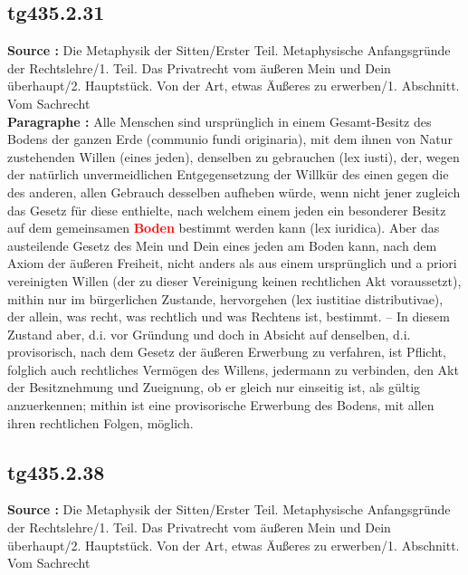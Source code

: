 \documentclass[a4paper,12pt,twoside]{book}
\newcommand{\match}[1]{\textcolor{red}{\textbf{#1}}}
\begin{document}
	\subsection*{tg435.2.31} 
	\textbf{Source : }Die Metaphysik der Sitten/Erster Teil. Metaphysische Anfangsgründe der Rechtslehre/1. Teil. Das Privatrecht vom äußeren Mein und Dein überhaupt/2. Hauptstück. Von der Art, etwas Äußeres zu erwerben/1. Abschnitt. Vom Sachrecht\\  
	
	\textbf{Paragraphe : }Alle Menschen sind ursprünglich in einem Gesamt-Besitz des Bodens der ganzen Erde (communio fundi originaria), mit dem ihnen von Natur zustehenden Willen (eines jeden), denselben zu gebrauchen (lex iusti), der, wegen der natürlich unvermeidlichen Entgegensetzung der Willkür des einen gegen die des anderen, allen Gebrauch desselben aufheben würde, wenn nicht jener zugleich das Gesetz für diese enthielte, nach welchem einem jeden ein besonderer Besitz auf dem gemeinsamen \match{Boden} bestimmt werden kann (lex iuridica). Aber das austeilende Gesetz des Mein und Dein eines jeden am Boden kann, nach dem Axiom der äußeren Freiheit, nicht anders als aus einem ursprünglich und a priori vereinigten Willen (der zu dieser Vereinigung keinen rechtlichen Akt voraussetzt), mithin nur im bürgerlichen Zustande, hervorgehen (lex iustitiae distributivae), der allein, was recht, was rechtlich und was Rechtens ist, bestimmt. – In diesem Zustand aber, d.i. vor Gründung und doch in Absicht auf denselben, d.i. provisorisch, nach dem Gesetz der äußeren Erwerbung zu verfahren, ist Pflicht, folglich auch rechtliches Vermögen des Willens, jedermann zu verbinden, den Akt der Besitznehmung und Zueignung, ob er gleich nur einseitig ist, als gültig anzuerkennen; mithin ist eine provisorische Erwerbung des Bodens, mit allen ihren rechtlichen Folgen, möglich. 
	
	\subsection*{tg435.2.38} 
	\textbf{Source : }Die Metaphysik der Sitten/Erster Teil. Metaphysische Anfangsgründe der Rechtslehre/1. Teil. Das Privatrecht vom äußeren Mein und Dein überhaupt/2. Hauptstück. Von der Art, etwas Äußeres zu erwerben/1. Abschnitt. Vom Sachrecht\\  
	
\end{document}
